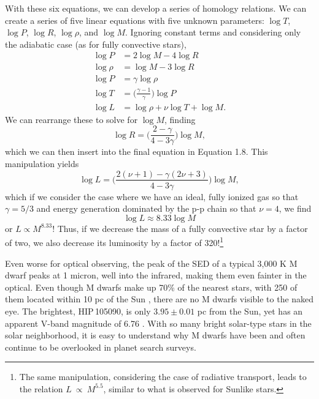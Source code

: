 With these six equations, we can develop a series of homology relations. We can create
a series of five linear equations with five unknown parameters: $\log T$, $\log P$, 
$\log R$, $\log \rho$, and $\log M$.
Ignoring constant terms and considering only the adiabatic case (as for fully 
convective stars),
\begin{align}
\log P &= 2 \log M - 4 \log R \nonumber \\
\log \rho &= \log M - 3 \log R \nonumber \\
\log P &= \gamma \log \rho \\
\log T &= \bigg(\frac{\gamma - 1}{\gamma}\bigg) \log P \nonumber \\
\log L &= \log \rho + \nu \log T + \log M \nonumber.
\end{align}
We can rearrange these to solve for $\log M$, finding
\begin{equation}
\log R = \bigg(\frac{2-\gamma}{4 - 3\gamma}\bigg) \log M,
\end{equation}
which we can then insert into the final equation in Equation 1.8.
This manipulation yields
\begin{equation}
\log L = \bigg(\frac{2(\nu + 1) - \gamma(2\nu + 3)}{4 - 3\gamma}\bigg) \log M,
\end{equation}
which if we consider the case where we have an ideal, fully ionized gas so that $\gamma = 5/3$ and energy generation dominated by the p-p chain so that $\nu = 4$, we find
\begin{equation}
\log L \approx 8.33 \log M
\end{equation}
or $L \propto M^{8.33}$! Thus, if we decrease the mass of a fully convective star by a factor of two, 
we also decrease its luminosity by a factor of 320!\footnote{The same manipulation,
considering the case of radiative transport, leads to the relation $L~\propto~M^{5.5}$,
similar to what is observed for Sunlike stars.} 

Even worse for optical observing,
the peak of the SED of a typical 3,000 K M dwarf peaks at 1 micron, well into the infrared, making them even fainter in the optical.
Even though M dwarfs make up 70\% of the nearest stars, with 250 of them located within
10 pc of the Sun \citep[e.g.][]{Henry06}, there are no M dwarfs visible to the naked 
eye.
The brightest, HIP\,105090, is only $3.95 \pm 0.01$ pc from the Sun, yet has an apparent V-band magnitude of 6.76 \citep{vanLeeuwen07}.
With so many bright solar-type stars in the solar neighborhood, it is easy to understand why M dwarfs have been and often continue to be overlooked in planet search
surveys. 

